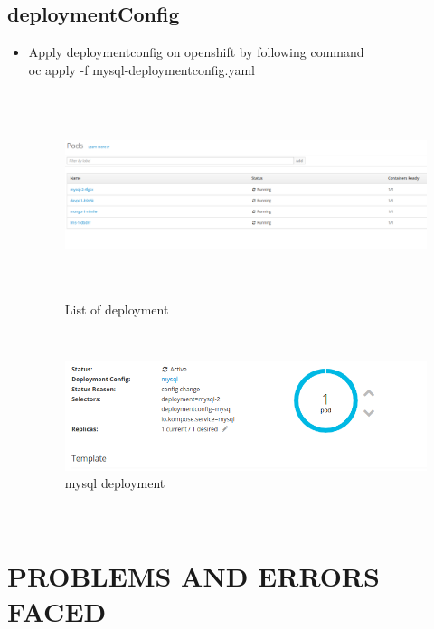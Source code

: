 \documentclass[11pt]{report}
\begin{document}
	\section{deploymentConfig}
	\begin{itemize}
		\item Apply deploymentconfig on openshift by following command
	\	\\
		oc apply -f mysql-deploymentconfig.yaml
		\ \\
		\begin{figure}[h!]
    	\begin{center}
    	   				\includegraphics[width=16cm,height=6cm]{pod.png}
    		\caption{List of deployment}
    	  \end{center}
	  
	\end{figure}
				
		\ \\
			\begin{figure}[h!]
    	\begin{center}
    	   				\includegraphics[scale=0.5]{podxample}
    		\caption{mysql deployment}
    	  \end{center}
	  
	\end{figure}
	
		
		\ \\
	\end{itemize}
	\chapter{PROBLEMS AND ERRORS FACED}
\end{document}
